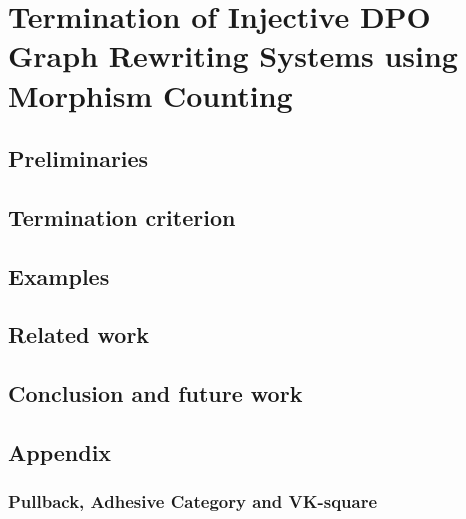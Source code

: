 \documentclass{report}
\begin{document}
\chapter{Termination of Injective DPO Graph Rewriting
Systems using Morphism Counting}
\label{chap:subgraph_counting}

\label{sec:intro}


\section{Preliminaries} 
\label{sec:pre} 


 
 
\section{Termination criterion}
\label{sec:termination} 

 

\section{Examples}
\label{sec:examples}


  
\section{Related work}
\label{sec:related_work} 


\section{Conclusion and future work}
\label{sec:conclusion} 


\section{Appendix}
\subsection*{Pullback, Adhesive Category and VK-square}

\end{document}
